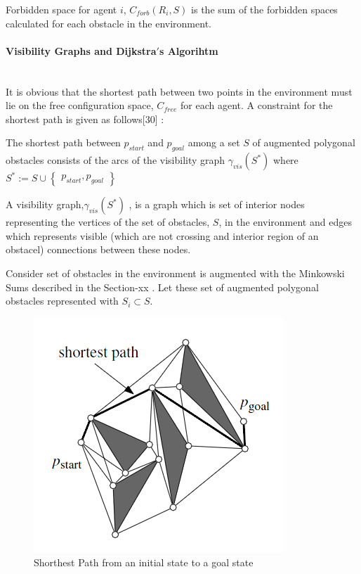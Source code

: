 Forbidden space for agent $i$, $C_{forb}(R_i, S)$ is the sum of the forbidden spaces calculated for each obstacle in the environment. 
	
\paragraph{Visibility Graphs and Dijkstra$'$s Algorihtm}\hspace{0pt} \\
It is obvious that the shortest path between two points in the environment must lie on the free configuration space, $C_{free}$ for each agent. A constraint for the shortest path is given as follows[30] : 

\begin{displayquote}
The shortest path between $p_{start}$ and $p_{goal}$ among a set $S$ of augmented polygonal obstacles consists of the arcs of the visibility graph $\gamma_{vis}(S^*)$ where $S^* := S \cup \begin{Bmatrix}
p_{start}, p_{goal}
\end{Bmatrix}$
\end{displayquote}

A visibility graph,$\gamma_{vis}(S^*)$ , is a graph which is set of interior nodes representing the vertices of the set of obstacles, $S$, in the environment and edges which represents visible (which are not crossing and interior region of an obstacel) connections between these nodes. 

Consider set of obstacles in the environment is augmented with the Minkowski Sums described in the Section-xx . Let these set of augmented polygonal obstacles represented with $S_i \subset S$. 

\begin{figure}[H]
\caption{Shorthest Path from an initial state to a goal state}
\centering
\includegraphics[scale = 0.4]{shortest}
\end{figure} 

